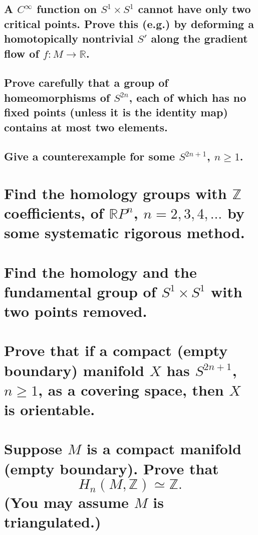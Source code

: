 \documentclass[10pt]{article}
\begin{document}
\subsection{A $C^\infty$ function on $S^1 \times S^1$ cannot have only two critical points. Prove
  this (e.g.) by deforming a homotopically nontrivial $S'$ along the gradient flow of $f: M \to \mathbb{R} $. }

\advsection{}

\subsection{Prove carefully that a group of homeomorphisms of $S^{2n}$, each of which has no fixed
  points (unless it is the identity map) contains at most two elements.}

\subsection{Give a counterexample for some $S^{2n+1}$, $n \geq 1$.}

\section{Find the homology groups with $\mathbb{Z}$ coefficients, of $\mathbb{R} P^n$, $n=2,3,4,
  \dots$ by some systematic rigorous method.}

\section{Find the homology and the fundamental group of $S^1 \times S^1$ with two points removed.}

\section{Prove that if a compact (empty boundary) manifold $X$ has $S^{2n+1}$, $n \geq 1$, as a
  covering space, then $X$ is orientable.}

\section{Suppose $M$ is a compact manifold (empty boundary). Prove that
$$H_n(M,\mathbb{Z} ) \simeq \mathbb{Z} .$$
(You may assume $M$ is triangulated.)}
\end{document}
